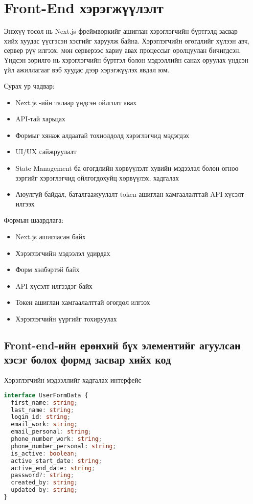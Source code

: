 \section{Front-End хэрэгжүүлэлт}
Энэхүү төсөл нь Next.js фреймворкийг ашиглан хэрэглэгчийн бүртгэлд засвар хийх хуудас үүсгэсэн хэсгийг харуулж байна. Хэрэглэгчийн өгөгдлийг хүлээн авч, сервер рүү илгээх, мөн серверээс хариу авах процессыг оролцуулан бичигдсэн. Үндсэн зорилго нь хэрэглэгчийн бүртгэл болон мэдээллийн санах оруулах үндсэн үйл ажиллагааг вэб хуудас дээр хэрэгжүүлэх явдал юм.

Сурах ур чадвар:
\begin{itemize}
	\item Next.js -ийн талаар үндсэн ойлголт авах
	\item API-тай харьцах
	\item Формыг хянаж алдаатай тохиолдолд хэрэглэгчид мэдэгдэх
	\item UI/UX сайжруулалт
	\item State Management ба өгөгдлийн хөрвүүлэлт хувийн мэдээлэл болон огноо зэргийг хэрэглэгчид ойлгогдохуйц хөрвүүлэх, хадгалах
	\item Аюулгүй байдал, баталгаажуулалт token ашиглан хамгаалалттай API хүсэлт илгээх
\end{itemize}

Формын шаардлага:
\begin{itemize}
	\item Next.js ашигласан байх
	\item Хэрэглэгчийн мэдээлэл удирдах
	\item Форм хэлбэртэй байх
	\item API хүсэлт илгээдэг байх
	\item Токен ашиглан хамгаалалттай өгөгдөл илгээх
	\item Хэрэглэгчийн үүргийг тохируулах
\end{itemize}
\pagebreak

\subsection{Front-end-ийн ерөнхий бүх элементийг агуулсан хэсэг болох формд засвар хийх код}

Хэрэглэгчийн мэдээллийг хадгалах интерфейс

\begin{lstlisting}[language=Typescript, caption=UserFormData интерфейсийг үүсгэсэн байдал, frame=single]
interface UserFormData {
  first_name: string;
  last_name: string;
  login_id: string;
  email_work: string;
  email_personal: string;
  phone_number_work: string;
  phone_number_personal: string;
  is_active: boolean;
  active_start_date: string;
  active_end_date: string;
  password?: string;
  created_by: string;
  updated_by: string;
}
\end{lstlisting}

